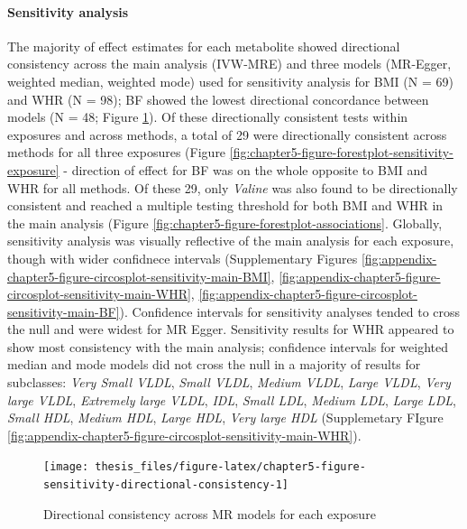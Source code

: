 \documentclass[11pt,twoside]{bristolthesis}
\begin{document}
\hypertarget{sensitivity-analysis-1}{%
\paragraph{Sensitivity analysis}\label{sensitivity-analysis-1}}

The majority of effect estimates for each metabolite showed directional consistency across the main analysis (IVW-MRE) and three models (MR-Egger, weighted median, weighted mode) used for sensitivity analysis for BMI (N = 69) and WHR (N = 98); BF showed the lowest directional concordance between models (N = 48; Figure \ref{fig:chapter5-figure-sensitivity-directional-consistency}). Of these directionally consistent tests within exposures and across methods, a total of 29 were directionally consistent across methods for all three exposures (Figure \ref{fig:chapter5-figure-forestplot-sensitivity-exposure} - direction of effect for BF was on the whole opposite to BMI and WHR for all methods. Of these 29, only \emph{Valine} was also found to be directionally consistent and reached a multiple testing threshold for both BMI and WHR in the main analysis (Figure \ref{fig:chapter5-figure-forestplot-associations}. Globally, sensitivity analysis was visually reflective of the main analysis for each exposure, though with wider confidnece intervals (Supplementary Figures \ref{fig:appendix-chapter5-figure-circosplot-sensitivity-main-BMI}, \ref{fig:appendix-chapter5-figure-circosplot-sensitivity-main-WHR}, \ref{fig:appendix-chapter5-figure-circosplot-sensitivity-main-BF}). Confidence intervals for sensitivity analyses tended to cross the null and were widest for MR Egger. Sensitivity results for WHR appeared to show most consistency with the main analysis; confidence intervals for weighted median and mode models did not cross the null in a majority of results for subclasses: \emph{Very Small VLDL}, \emph{Small VLDL}, \emph{Medium VLDL}, \emph{Large VLDL}, \emph{Very large VLDL}, \emph{Extremely large VLDL}, \emph{IDL}, \emph{Small LDL}, \emph{Medium LDL}, \emph{Large LDL}, \emph{Small HDL}, \emph{Medium HDL}, \emph{Large HDL}, \emph{Very large HDL} (Supplemetary FIgure \ref{fig:appendix-chapter5-figure-circosplot-sensitivity-main-WHR}).
\begin{figure}
\texttt{[image: thesis\_files/figure-latex/chapter5-figure-sensitivity-directional-consistency-1]} \caption{Directional consistency across MR models for each exposure}\label{fig:chapter5-figure-sensitivity-directional-consistency}
\end{figure}
\noindent 
\end{document}
